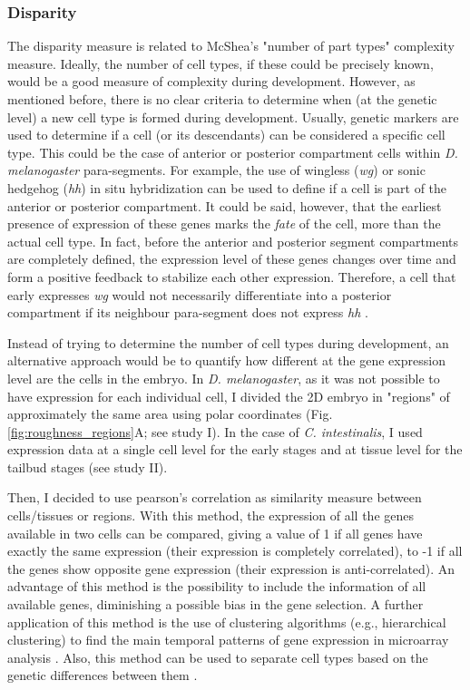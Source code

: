 \subsubsection{Disparity}

The disparity measure is related to  McShea's "number of part types" complexity measure. Ideally, the number of cell types, if these could be precisely known, would be a good measure of complexity during development. However, as mentioned before, there is no clear criteria to determine when (at the genetic level) a new cell type is formed during development. 
Usually, genetic markers are used to determine if a cell (or its descendants) can be considered a specific cell type. This could be the case of anterior or posterior compartment cells within \textit{D. melanogaster} para-segments. For example, the use of wingless (\textit{wg}) or sonic hedgehog (\textit{hh}) in situ hybridization can be used to define if a cell is part of the anterior or posterior compartment. It could be said, however, that the earliest presence of expression of these genes marks the \textit{fate} of the cell, more than the actual cell type. In fact, before the anterior and posterior segment compartments are completely defined, the expression level of these genes changes over time and form a positive feedback to stabilize each other expression. Therefore, a cell that early expresses \textit{wg} would not necessarily differentiate into a posterior compartment if its neighbour para-segment does not express \textit{hh} \citep{Bejsovec1991}.
 
Instead of trying to determine the number of cell types during development, an alternative approach would be to quantify how different at the gene expression level are the cells in the embryo. In \textit{D. melanogaster}, as it was not possible to have expression for each individual cell, I divided the 2D embryo in "regions" of approximately the same area using polar coordinates (Fig. \ref{fig:roughness_regions}A; see study I). In the case of \textit{C. intestinalis}, I used expression data at a single cell level for the early stages and at tissue level for the tailbud stages (see study II).

Then, I decided to use pearson's correlation as similarity measure between cells/tissues or regions. With this method, the expression of all the genes available in two cells can be compared, giving a value of 1 if all genes have exactly the same expression (their expression is completely correlated), to -1 if all the genes show opposite gene expression (their expression is anti-correlated). An advantage of this method is the possibility to include the information of all available genes, diminishing a possible bias in the gene selection. A further application of this method is the use of clustering algorithms (e.g., hierarchical clustering) to find the main temporal patterns of gene expression in microarray analysis \citep{Eisen1998,Wen1998}. Also, this method can be used to separate cell types based on the genetic differences between them \citep{gohlmann2009gene}.

